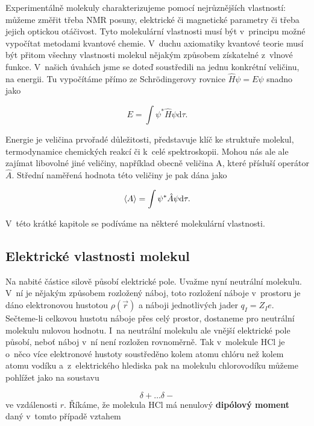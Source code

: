 Experimentálně molekuly charakterizujeme pomocí nejrůznějších vlastností: můžeme změřit třeba NMR posuny, elektrické či magnetické parametry či třeba jejich optickou otáčivost. Tyto molekulární vlastnosti musí být v~principu možné vypočítat metodami kvantové chemie. V~duchu axiomatiky kvantové teorie musí být přitom všechny vlastnosti molekul nějakým způsobem získatelné z~vlnové funkce. V~našich úvahách jsme se doteď soustředili na jednu konkrétní veličinu, na energii. Tu vypočítáme přímo ze Schr\"odingerovy rovnice $\hat{H} \psi = E \psi$ snadno jako

\begin{equation}
E = \int \psi^{\ast} \hat{H} \psi \mathrm{d} \tau.
\label{rov:Vl-1}
\end{equation}

Energie je veličina prvořadé důležitosti, představuje klíč ke struktuře molekul, termodynamice chemických reakcí či k~celé spektroskopii. Mohou nás ale ale zajímat libovolné jiné veličiny, například obecně veličina A, které přísluší operátor $\hat{A}$. Střední naměřená hodnota této veličiny je pak dána jako

\begin{equation}
\braket{A} = \int \psi^{\ast} \hat{A} \psi \mathrm{d} \tau.
\label{rov:Vl-2}
\end{equation}

V~této krátké kapitole se podíváme na některé molekulární vlastnosti.

  
\subsection{Elektrické vlastnosti molekul}
Na nabité částice silově působí elektrické pole. Uvažme nyní neutrální molekulu. V~ní je nějakým způsobem rozložený náboj, toto rozložení náboje v~prostoru je dáno elektronovou hustotou $\rho(\vec{r})$ a náboji jednotlivých jader $q_I=Z_I e$. Sečteme-li celkovou hustotu náboje přes celý prostor, dostaneme pro neutrální molekulu nulovou hodnotu. I~na neutrální molekulu ale vnější elektrické pole působí, neboť náboj v~ní není rozložen rovnoměrně. Tak v~molekule HCl je o~něco více elektronové hustoty soustředěno kolem atomu chlóru než kolem atomu vodíku a~z~elektrického hlediska pak na molekulu chlorovodíku můžeme pohlížet jako na soustavu

\begin{equation}
\delta+ \dots \delta- \nonumber
\end{equation}
ve vzdálenosti $r$. Říkáme, že molekula HCl má nenulový \textbf{dipólový moment} daný v~tomto případě vztahem

